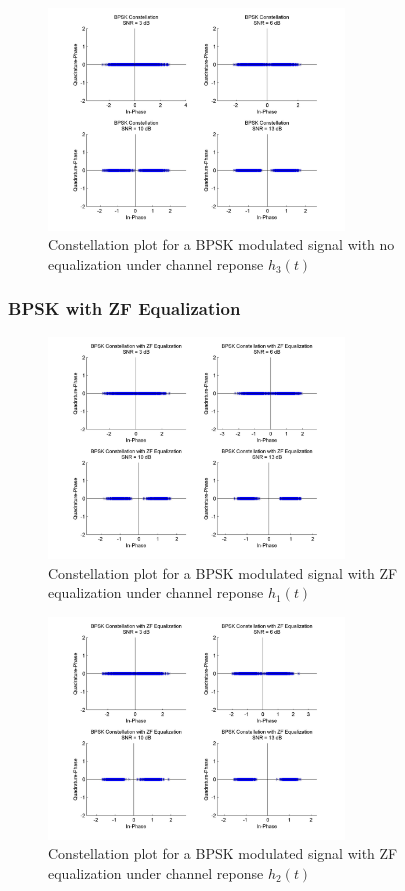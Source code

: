\documentclass[]{article}
\begin{document}
\begin{figure}[H]
\centering
\includegraphics[width=0.7\textwidth]{bpConst3.jpg}
\caption{Constellation plot for a BPSK modulated signal with no equalization under channel reponse $h_3(t)$}
\end{figure}

\subsubsection{BPSK with ZF Equalization}

\begin{figure}[H]
\centering
\includegraphics[width=0.7\textwidth]{bpConstZF1.jpg}
\caption{Constellation plot for a BPSK modulated signal with ZF equalization under channel reponse $h_1(t)$}
\end{figure}

\begin{figure}[H]
\centering
\includegraphics[width=0.7\textwidth]{bpConstZF2.jpg}
\caption{Constellation plot for a BPSK modulated signal with ZF equalization under channel reponse $h_2(t)$}
\end{figure}
\end{document}
